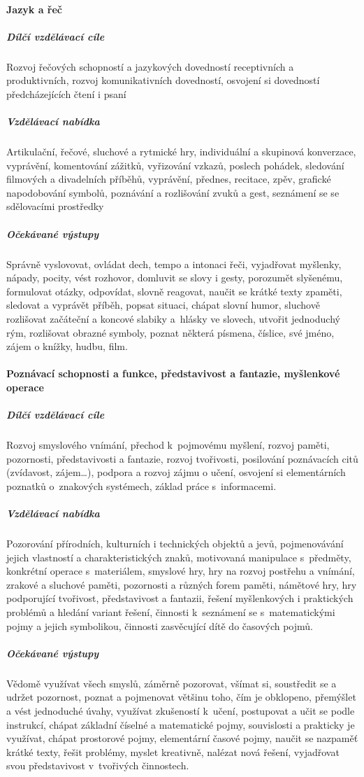 				\paragraph{Jazyk a řeč}

					\subparagraph{Dílčí vzdělávací cíle}
						Rozvoj řečových schopností a jazykových dovedností receptivních a produktivních, rozvoj komunikativních dovedností, osvojení si dovedností předcházejících čtení i psaní
					\subparagraph{Vzdělávací nabídka}
						Artikulační, řečové, sluchové a rytmické hry, individuální a skupinová konverzace, vyprávění, komentování zážitků, vyřizování vzkazů, poslech pohádek, sledování filmových a divadelních příběhů, vyprávění, přednes, recitace, zpěv, grafické napodobování symbolů, poznávání a rozlišování zvuků a gest, seznámení se se sdělovacími prostředky
					\subparagraph{Očekávané výstupy}
						Správně vyslovovat, ovládat dech, tempo a intonaci řeči, vyjadřovat myšlenky, nápady, pocity, vést rozhovor, domluvit se slovy i gesty, porozumět slyšenému, formulovat otázky, odpovídat, slovně reagovat, naučit se krátké texty zpaměti, sledovat a vyprávět příběh, popsat situaci, chápat slovní humor, sluchově rozlišovat začáteční a koncové slabiky a hlásky ve slovech, utvořit jednoduchý rým, rozlišovat obrazné symboly, poznat některá písmena, číslice, své jméno, zájem o knížky, hudbu, film.

				\paragraph{Poznávací schopnosti a funkce, představivost a fantazie, myšlenkové operace}

					\subparagraph{Dílčí vzdělávací cíle}
						Rozvoj smyslového vnímání, přechod k pojmovému myšlení, rozvoj paměti, pozornosti, představivosti a fantazie, rozvoj tvořivosti, posilování poznávacích citů (zvídavost, zájem…), podpora a rozvoj zájmu o učení, osvojení si elementárních poznatků o znakových systémech, základ práce s informacemi.
					\subparagraph{Vzdělávací nabídka}
						Pozorování přírodních, kulturních i technických objektů a jevů, pojmenovávání jejich vlastností a charakteristických znaků, motivovaná manipulace s předměty, konkrétní operace s materiálem, smyslové hry, hry na rozvoj postřehu a vnímání, zrakové a sluchové paměti, pozornosti a různých forem paměti, námětové hry, hry podporující tvořivost, představivost a fantazii, řešení myšlenkových i praktických problémů a hledání variant řešení, činnosti k seznámení se s matematickými pojmy a jejich symbolikou, činnosti zasvěcující dítě do časových pojmů.
					\subparagraph{Očekávané výstupy}
						Vědomě využívat všech smyslů, záměrně pozorovat, všímat si, soustředit se a udržet pozornost, poznat a pojmenovat většinu toho, čím je obklopeno, přemýšlet a vést jednoduché úvahy, využívat zkušeností k učení, postupovat a učit se podle instrukcí, chápat základní číselné a matematické pojmy, souvislosti a prakticky je využívat, chápat prostorové pojmy, elementární časové pojmy, naučit se nazpaměť krátké texty, řešit problémy, myslet kreativně, nalézat nová řešení, vyjadřovat svou představivost v tvořivých činnostech.

